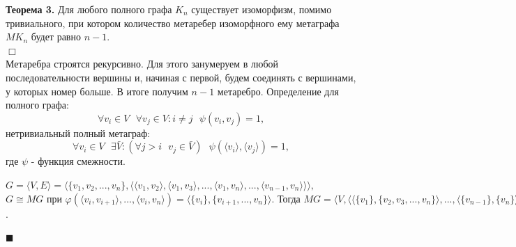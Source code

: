 \textbf{Теорема 3.} Для любого полного графа $K_{n}$ существует изоморфизм, помимо тривиального, при котором количество метаребер изоморфного ему метаграфа $MK_{n}$ будет равно $n-1$. 
\\$\Box$\\ Метаребра строятся рекурсивно. Для этого занумеруем в любой последовательности вершины и, начиная с первой, будем соединять с вершинами, у которых номер больше. В итоге получим $n-1$ метаребро.
Определение для полного графа: 
$$\forall v_{i}\in V \text{ } \forall v_{j} \in V: i \neq j \text{ } \psi(v_{i}, v_{j}) = 1,$$
нетривиальный полный метаграф:$$\forall v_{i} \in V \text{ } \exists \bar{V}: (\forall j>i \text{  } v_{j} \in \bar{V}) \text{ }\psi(\langle v_i \rangle, \langle v_j \rangle) = 1,$$
где $\psi$ - функция смежности.


$G=\langle V,E \rangle=\Big \langle\{v_1,v_2,...,v_n \},\big\langle \langle v_1, v_2 \rangle, \langle v_1, v_3 \rangle,...,\langle v_1, v_n \rangle,...,\langle v_{n-1}, v_{n} \rangle \big\rangle \Big\rangle\text{,}$\\$  G \cong MG\text{ при } \varphi(\langle v_i,v_{i+1}\rangle,...,\langle v_i,v_n \rangle) = \langle \{v_i\}, \{v_{i+1}, ..., v_{n}\} \rangle. \text{ Тогда } MG=\Big \langle V,\big\langle \langle \{v_1\}, \{v_2,v_3,..., v_n\} \rangle,...,\langle \{v_{n-1}\}, \{v_{n}\} \rangle \big\rangle \Big\rangle$.
\vspace{-0.6cm}
\begin{flushright}
$\blacksquare$
\end{flushright}
\vspace{-0.6cm}

